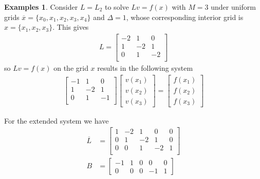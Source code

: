 \documentclass[11pt]{article}
\theoremstyle{definition}
\newtheorem{example}{Examples}[section]
\begin{document}
\begin{example}\label{ex:gaussian-elimination-reflecting-barrier}
	 Consider $L = L_{2}$ to solve $L v = f(x)$ with $M = 3$ under uniform grids $\overline{x} = \{x_0, x_1, x_2, x_3, x_4\}$ and $\Delta = 1$, whose corresponding interior grid is $x = \{x_1, x_2, x_3\}$. This gives
	 \begin{align}
	 L = 	 \begin{bmatrix}
	 -2 & 1 & 0 \\
	 1 & -2 & 1 \\
	 0 & 1 & -2 \\
	 \end{bmatrix}
	 \end{align}
	 so $L v= f(x)$ on the grid $x$ results in the following system
	 \begin{align} \label{eq:extended-system-reflecting-barrier-reduced-system}
	 	 	 \begin{bmatrix}
	 -1 & 1 & 0  \\
	 1 & -2 & 1 \\
	 0 & 1 & -1 \\
	 \end{bmatrix} 	  \begin{bmatrix}
	 v(x_1) \\
	 v(x_2) \\
	 v(x_3) 
	 \end{bmatrix}
	 = 
	 \begin{bmatrix}
	 f(x_1) \\
	 f(x_2) \\
	 f(x_3) 
	 \end{bmatrix} 
	 \end{align}
	 
	 
	 For the extended system we have
	 \begin{align}
	 \overline{L} &= 
	 \begin{bmatrix}
	 1 & -2 & 1 & 0 & 0 \\
	 0 & 1 & -2 & 1 & 0 \\
	 0 & 0 & 1 & -2 & 1 \\
	 \end{bmatrix} \\
	 B &= \begin{bmatrix}
  	-1 & 1  & 0 & 0 & 0 \\
	0 & 0 & 0 & -1 & 1
	 \end{bmatrix}
	 \end{align}
	 

\end{example}
\end{document}
